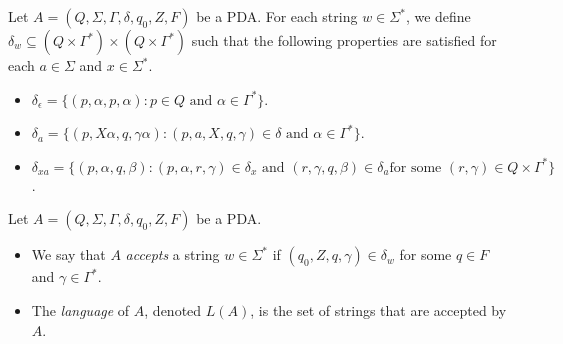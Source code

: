 \begin{definition}
  Let $A = (Q, \Sigma, \Gamma, \delta, q_0, Z, F)$ be a PDA.
  For each string $w \in \Sigma^*$, we define
  $\delta_w \subseteq (Q \times \Gamma^*) \times (Q \times \Gamma^*)$ such that
  the following properties are satisfied for each $a \in \Sigma$ and
  $x \in \Sigma^*$.
  \begin{itemize}
    \item $\delta_\epsilon = \{(p, \alpha, p, \alpha) :
    \text{$p \in Q$ and $\alpha \in \Gamma^*$}\}$.
    \item $\delta_a = \{(p, X\alpha, q, \gamma\alpha) :
    \text{$(p, a, X, q, \gamma) \in \delta$ and $\alpha \in \Gamma^*$}\}$.
    \item $\delta_{xa} = \{(p, \alpha, q, \beta):
    \text{$(p, \alpha, r, \gamma) \in \delta_x$ and
    $(r, \gamma, q, \beta) \in \delta_a$
    for some $(r, \gamma) \in Q \times \Gamma^*$}\}$.
  \end{itemize}
\end{definition}

\begin{definition}
  Let $A = (Q, \Sigma, \Gamma, \delta, q_0, Z, F)$ be a PDA.
  \begin{itemize}
    \item We say that $A$ \emph{accepts} a string $w \in \Sigma^*$ if
    $(q_0, Z, q, \gamma) \in \delta_w$ for some $q \in F$ and
    $\gamma \in \Gamma^*$.
    \item The \emph{language} of $A$, denoted $L(A)$, is the set of strings
    that are accepted by $A$.
  \end{itemize}
\end{definition}